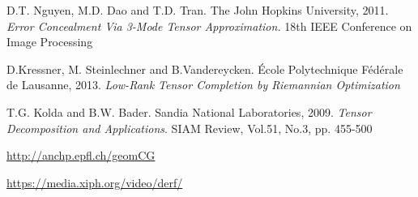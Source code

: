 \documentclass[a4paper, 11pt]{article} %
\begin{document}
\begin{thebibliography}{9}

D.T. Nguyen, M.D. Dao and T.D. Tran. {The John Hopkins University}, 2011.
\textit{Error Concealment Via 3-Mode Tensor Approximation.} 18th IEEE Conference on Image Processing


D.Kressner, M. Steinlechner and B.Vandereycken.{ \'Ecole Polytechnique F\'ed\'erale de Lausanne}, 2013. \textit{Low-Rank Tensor Completion by Riemannian Optimization}


  T.G. Kolda and B.W. Bader. {Sandia National Laboratories}, 2009.
\textit{Tensor Decomposition and Applications}. SIAM Review, Vol.51, No.3, pp. 455-500

 \url{http://anchp.epfl.ch/geomCG}

 \url{https://media.xiph.org/video/derf/}
\end{thebibliography}

%
%
%
\end{document}
